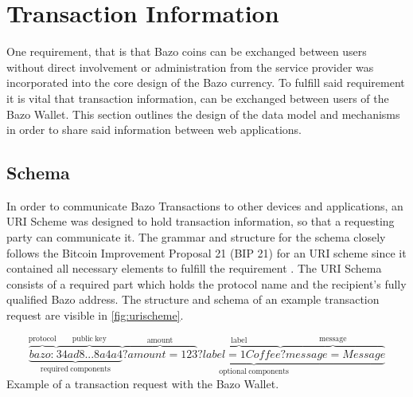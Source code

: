 \section{Transaction Information} \label{transactioninfo}
One requirement, that is that Bazo coins can be exchanged between users without direct involvement or administration from the service provider was incorporated into the core design of the Bazo currency. To fulfill said requirement it is vital that transaction information, can be exchanged between users of the Bazo Wallet. This section outlines the design of the data model and mechanisms in order to share said information between web applications.
\subsection{Schema}\label{schema}
In order to communicate Bazo Transactions to other devices and applications, an URI Scheme was designed to hold transaction information, so that a requesting party can communicate it. The grammar and structure for the schema closely follows the Bitcoin Improvement Proposal 21 (BIP 21) for an URI scheme since it contained all necessary elements to fulfill the requirement \cite{bip21}. The URI Schema consists of a required part which holds the protocol name and the recipient's fully qualified Bazo address. The structure and schema of an example transaction request are visible in \ref{fig:urischeme}.

\[
\underbrace{\overbrace{bazo:}^{\mathrm{protocol}}\overbrace{34ad8...8a4a4}^{\mathrm{public\ key}}}_{\mathrm{required\ components}}
\underbrace{\overbrace{?amount=123}^{\mathrm{amoun t}}\overbrace{?label=1 Coffee}^{\mathrm{label}}\overbrace{?message=Message}^{\mathrm{message}}}_{\mathrm{optional\ components}}
\]\label{fig:urischeme} Example of a transaction request with the Bazo Wallet.

